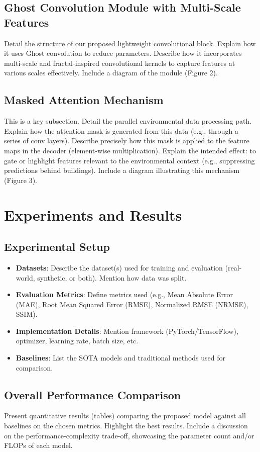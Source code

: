 \documentclass[conference]{IEEEtran}
\begin{document}
\subsection{Ghost Convolution Module with Multi-Scale Features}
Detail the structure of our proposed lightweight convolutional block. Explain how it uses Ghost 
convolution to reduce parameters. Describe how it incorporates multi-scale and fractal-inspired 
convolutional kernels to capture features at various scales effectively. Include a diagram of the 
module (Figure 2).
\subsection{Masked Attention Mechanism}
This is a key subsection. Detail the parallel environmental data processing path. Explain how the 
attention mask is generated from this data (e.g., through a series of conv layers). Describe precisely
 how this mask is applied to the feature maps in the decoder (element-wise multiplication). 
 Explain the intended effect: to gate or highlight features relevant to the environmental context (e.g., 
 suppressing predictions behind buildings). Include a diagram illustrating this mechanism (Figure 3).

\section{Experiments and Results}
\subsection{Experimental Setup}
\begin{itemize}
    \item \textbf{Datasets}: Describe the dataset(s) used for training and evaluation (real-world, 
    synthetic, or both). Mention how data was split.
    \item \textbf{Evaluation Metrics}: Define metrics used (e.g., Mean Absolute Error (MAE), Root 
    Mean Squared Error (RMSE), Normalized RMSE (NRMSE), SSIM).
    \item \textbf{Implementation Details}: Mention framework (PyTorch/TensorFlow), optimizer, 
    learning rate, batch size, etc.
    \item \textbf{Baselines}: List the SOTA models and traditional methods used for comparison.
\end{itemize}
\subsection{Overall Performance Comparison}
Present quantitative results (tables) comparing the proposed model against all baselines on the 
chosen metrics. Highlight the best results. Include a discussion on the performance-complexity trade-off, 
showcasing the parameter count and/or FLOPs of each model.
\end{document}
